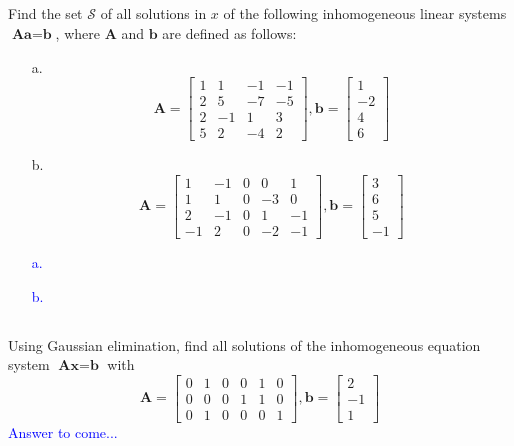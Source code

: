 \documentclass[a4paper,12pt]{article}
\newcommand{\M}[1]{ \begin{bmatrix} #1 \end{bmatrix} }
\newcommand{\vecx}{\textbf{x}}
\newcommand{\veca}{\textbf{a}}
\newcommand{\vecb}{\textbf{b}}
\newcommand{\matA}{\textbf{A}}
\begin{document}
\subsection{}
Find the set $\mathcal{S}$ of all solutions in $x$ of the following inhomogeneous linear systems $\matA \veca = \vecb$, where $\matA$ and $\vecb$ are defined as follows:
\begin{itemize}
 \item [a.] $$\matA = \M{1&1&-1&-1\\2&5&-7&-5\\2&-1&1&3\\5&2&-4&2}, \vecb = \M{1\\-2\\4\\6}$$
 \item [b.] $$\matA = \M{1&-1&0&0&1\\1&1&0&-3&0\\2&-1&0&1&-1\\-1&2&0&-2&-1}, \vecb = \M{3\\6\\5\\-1}$$
\end{itemize}
\textcolor{blue}{
\begin{itemize}
 \item [a.] 
 \item [b.] 
\end{itemize}
}
\subsection{}
Using Gaussian elimination, find all solutions of the inhomogeneous equation system $\matA \vecx=\vecb$ with
$$\matA = \M{0&1&0&0&1&0\\0&0&0&1&1&0\\0&1&0&0&0&1}, \vecb = \M{2\\-1\\1}$$
\textcolor{blue}{
Answer to come...
}
\end{document}
